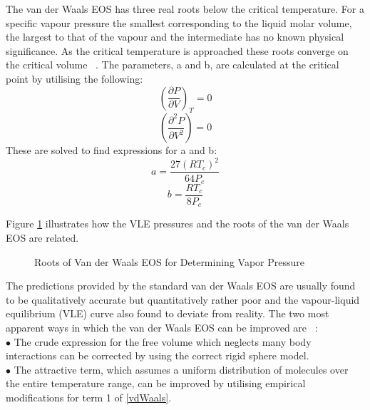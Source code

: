 	The van der Waals EOS has three real roots below the critical temperature. For a specific vapour pressure the smallest corresponding to the liquid molar volume, the largest to that of the vapour and the intermediate has no known physical significance. As the critical temperature is approached these roots converge on the critical volume ~\cite{ThermophysicalProperties}. The parameters, a and b, are calculated at the critical point by utilising the following:
			\begin{equation}
					\left( \dfrac{\partial P}{\partial V}\right) _{T}=0 
			\end{equation}
			\begin{equation}
					\left( \dfrac{\partial^{2}P}{\partial V^{2}}\right) =0
			\end{equation}
These are solved to find expressions for a and b:
			\begin{equation}
					a = \dfrac{27 \left( RT_{c} \right) ^{2}}{64P_{c}} \label{Consta}
			\end{equation}
			\begin{equation}
					b = \dfrac{ RT_{c}}{8P_{c}} \label{Constb}
			\end{equation}

Figure \ref{roots} illustrates how the VLE pressures and the roots of the van der Waals EOS are related.
				
				\begin{figure}
					\begin{center}
				 		
					\end{center}
					\caption{Roots of Van der Waals EOS for Determining Vapor Pressure} \label{roots}
				\end{figure}

The predictions provided by the standard van der Waals EOS are usually found to be qualitatively accurate but quantitatively rather poor and the vapour-liquid equilibrium (VLE) curve also found to deviate from reality. The two most apparent ways in which the van der Waals EOS can be improved are  ~\cite{ThermophysicalProperties}:\\
$\bullet$ The crude expression for the free volume which neglects many body interactions can be corrected by using the correct rigid sphere model.\\
$\bullet$ The attractive term, which assumes a uniform distribution of molecules over the entire temperature range, can be improved by utilising empirical modifications for term 1 of \ref{vdWaals}.\\

